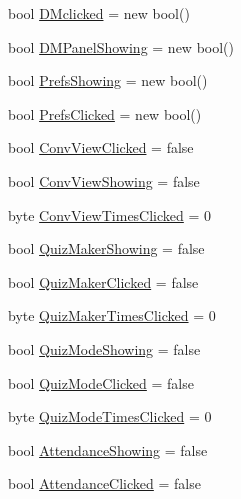 \begin{DoxyCompactItemize}
\item 
bool \hyperlink{class_sr_p___classroom_inq_1_1frm_classrrom_inq_a663c3385393ae39a41bd647632ba4617}{\-D\-Mclicked} = new bool()
\item 
bool \hyperlink{class_sr_p___classroom_inq_1_1frm_classrrom_inq_a7a4d3ad70d4284ad3f7d8ab3ca8718e0}{\-D\-M\-Panel\-Showing} = new bool()
\item 
bool \hyperlink{class_sr_p___classroom_inq_1_1frm_classrrom_inq_a915bf1ba42b54c697d1d90043610385f}{\-Prefs\-Showing} = new bool()
\item 
bool \hyperlink{class_sr_p___classroom_inq_1_1frm_classrrom_inq_a9e5a6ce376468f2e13dae9f60e86ccf6}{\-Prefs\-Clicked} = new bool()
\item 
bool \hyperlink{class_sr_p___classroom_inq_1_1frm_classrrom_inq_a567cf412a542927bb47984c0e835a7d2}{\-Conv\-View\-Clicked} = false
\item 
bool \hyperlink{class_sr_p___classroom_inq_1_1frm_classrrom_inq_a5b2fbbaa361339e096aa4be3f8e2b2dd}{\-Conv\-View\-Showing} = false
\item 
byte \hyperlink{class_sr_p___classroom_inq_1_1frm_classrrom_inq_a8b7285b1ee1626d8ebdc99d4bd6046a8}{\-Conv\-View\-Times\-Clicked} = 0
\item 
bool \hyperlink{class_sr_p___classroom_inq_1_1frm_classrrom_inq_a527e6e32ab67073ccbdb94297399ab2d}{\-Quiz\-Maker\-Showing} = false
\item 
bool \hyperlink{class_sr_p___classroom_inq_1_1frm_classrrom_inq_a80b43512315939f073e08cfea00ce796}{\-Quiz\-Maker\-Clicked} = false
\item 
byte \hyperlink{class_sr_p___classroom_inq_1_1frm_classrrom_inq_ae28b52f195f8e33470bb7bbc988ba622}{\-Quiz\-Maker\-Times\-Clicked} = 0
\item 
bool \hyperlink{class_sr_p___classroom_inq_1_1frm_classrrom_inq_a2be9d2ea6cc1cabf0dc6c6f3ee2544ce}{\-Quiz\-Mode\-Showing} = false
\item 
bool \hyperlink{class_sr_p___classroom_inq_1_1frm_classrrom_inq_af09c14bf56f313348d1e4a533fe515bf}{\-Quiz\-Mode\-Clicked} = false
\item 
byte \hyperlink{class_sr_p___classroom_inq_1_1frm_classrrom_inq_a0c88b881dc5ae86b5b3d5e04434b2ea8}{\-Quiz\-Mode\-Times\-Clicked} = 0
\item 
bool \hyperlink{class_sr_p___classroom_inq_1_1frm_classrrom_inq_a24415681575df1fd435d1b1da60dfde3}{\-Attendance\-Showing} = false
\item 
bool \hyperlink{class_sr_p___classroom_inq_1_1frm_classrrom_inq_a319172bf9b9e58ec37499658a5289284}{\-Attendance\-Clicked} = false

\end{DoxyCompactItemize}
